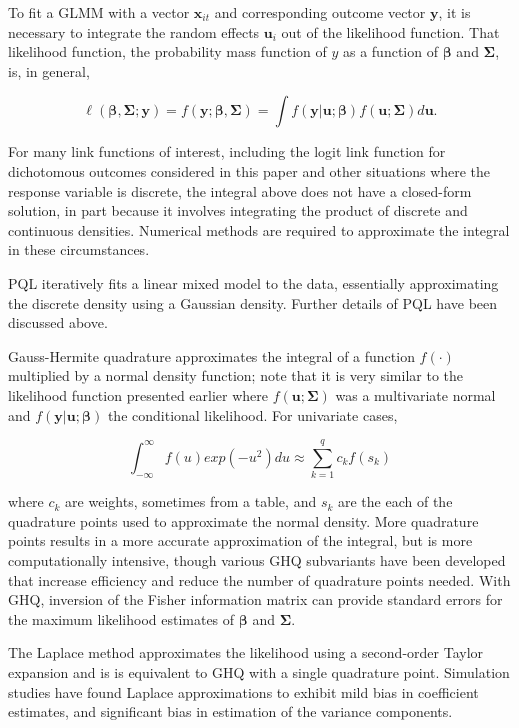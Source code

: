 \documentclass{article}
\begin{document}
\begin{flushleft}
To fit a GLMM with a vector $\mathbf{x}_{it}$ and corresponding outcome vector $\mathbf{y}$, it is necessary to integrate the random effects $\mathbf{u}_i$ out of the likelihood function\cite{rodriguez_assessment_1995}. That likelihood function, the probability mass function of $y$ as a function of $\boldsymbol{\beta}$ and $\mathbf{\Sigma}$\cite{agresti_categorical_2013}, is, in general,

\begin{equation}
 \ell(\boldsymbol{\beta}, \mathbf{\Sigma} ; \mathbf{y})=f(\mathbf{y};\boldsymbol{\beta}, \mathbf{\Sigma})=\int f(\mathbf{y}|\mathbf{u};\boldsymbol{\beta})f(\mathbf{u}; \mathbf{\Sigma})d\mathbf{u}.   
\end{equation}

For many link functions of interest, including the logit link function for dichotomous outcomes considered in this paper and other situations where the response variable is discrete, the integral above does not have a closed-form solution, in part because it involves integrating the product of discrete and continuous densities\cite{ng_estimation_2006}. Numerical methods are required to approximate the integral in these circumstances.

PQL iteratively fits a linear mixed model\cite{lin_bias_1996} to the data, essentially approximating the discrete density using a Gaussian density\cite{ng_estimation_2006}. Further details of PQL have been discussed above.

Gauss-Hermite quadrature approximates the integral of a function $f(\cdot)$ multiplied by a normal density function; note that it is very similar to the likelihood function presented earlier where $f(\mathbf{u}; \mathbf{\Sigma})$ was a multivariate normal and $f(\mathbf{y}|\mathbf{u};\boldsymbol{\beta})$ the conditional likelihood. For univariate cases,

\begin{equation}
    \int_{-\infty}^{\infty}f(u)exp(-u^2)du \approx \sum_{k=1}^q c_kf(s_k)
\end{equation}

where $c_k$ are weights, sometimes from a table, and $s_k$ are the each of the quadrature points used to approximate the normal density. More quadrature points results in a more accurate approximation of the integral, but is more computationally intensive, though various GHQ subvariants have been developed that increase efficiency and reduce the number of quadrature points needed\cite{pinheiro_efficient_2006}. With GHQ, inversion of the Fisher information matrix can provide standard errors for the maximum likelihood estimates of $\boldsymbol{\beta}$ and $\mathbf{\Sigma}$. 


The Laplace method approximates the likelihood using a second-order Taylor expansion \cite{pinheiro_approximations_1995} and is is equivalent to GHQ with a single quadrature point\cite{liu_note_1994}. Simulation studies have found Laplace approximations to exhibit mild bias in coefficient estimates, and significant bias in estimation of the variance components\cite{pinheiro_efficient_2006}.

\end{flushleft}

\clearpage
\printbibliography
\end{document}
